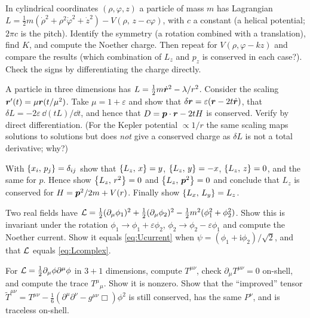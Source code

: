 \documentclass[11pt]{article}
\newcommand{\eps}{\varepsilon}
\begin{document}
\begin{exercise}\label{ex:screw}
In cylindrical coordinates $(\rho,\varphi,z)$ a particle of mass $m$ has Lagrangian $L=\tfrac12m(\dot\rho^2+\rho^2\dot\varphi^2+\dot z^2)-V(\rho,\,z-c\varphi)$, with $c$ a constant (a helical potential; $2\pi c$ is the pitch). Identify the symmetry (a rotation combined with a translation), find $K$, and compute the Noether charge. Then repeat for $V(\rho,\varphi-kz)$ and compare the results (which combination of $L_z$ and $p_z$ is conserved in each case?). Check the signs by differentiating the charge directly.
\end{exercise}

\begin{exercise}\label{ex:dilatation}
A particle in three dimensions has $L=\tfrac12m\dot{\bm{r}}^2-\lambda/r^2$. Consider the scaling $\bm{r}'(t)=\mu\bm{r}(t/\mu^2)$. Take $\mu=1+\eps$ and show that $\delta\vect r=\eps(\vect r-2t\dot{\vect r})$, that $\delta L=-2\eps\,\dd(tL)/\dd t$, and hence that $D=\bm{p}\cdot\bm{r}-2tH$ is conserved. Verify by direct differentiation. (For the Kepler potential $\propto1/r$ the same scaling maps solutions to solutions but does \emph{not} give a conserved charge as $\delta L$ is not a total derivative; why?)
\end{exercise}

\begin{exercise}\label{ex:Lz}
With $\left\{x_i,\,p_j\right\}=\delta_{ij}$ show that $\left\{L_z,\,x\right\}=y$, $\left\{L_z,\,y\right\}=-x$, $\left\{L_z,\,z\right\}=0$, and the same for $p$. Hence show $\left\{L_z,\,r^2\right\}=0$ and $\left\{L_z,\,\bm{p}^2\right\}=0$ and conclude that $L_z$ is conserved for $H=\bm{p}^2/2m+V(r)$. Finally show $\left\{L_x,\,L_y\right\}=L_z$.
\end{exercise}

\begin{exercise}\label{ex:SO2}
Two real fields have $\mathcal{L}=\tfrac12(\partial_\mu\phi_1)^2+\tfrac12(\partial_\mu\phi_2)^2-\tfrac12m^2(\phi_1^2+\phi_2^2)$. Show this is invariant under the rotation $\phi_1\to\phi_1+\eps\phi_2$, $\phi_2\to\phi_2-\eps\phi_1$ and compute the Noether current. Show it equals \eqref{eq:Ucurrent} when $\psi=(\phi_1+\mathrm i\phi_2)/\sqrt2$, and that $\mathcal{L}$ equals \eqref{eq:Lcomplex}.
\end{exercise}

\begin{exercise}\label{ex:trace}
For $\mathcal{L}=\tfrac12\partial_\mu\phi\partial^\mu\phi$ in $3+1$ dimensions, compute $T^{\mu\nu}$, check $\partial_\mu T^{\mu\nu}=0$ on-shell, and compute the trace $T^\mu{}_\mu$. Show it is nonzero. Show that the ``improved'' tensor $\tilde T^{\mu\nu}=T^{\mu\nu}-\tfrac16(\partial^\mu\partial^\nu-g^{\mu\nu}\Box)\phi^2$ is still conserved, has the same $P^\nu$, and is traceless on-shell.
\end{exercise}
\end{document}
